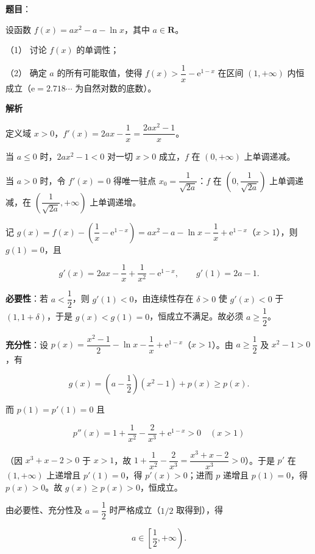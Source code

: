 \begin{answer}

\textbf{题目}：

设函数 \(f(x)=ax^{2}-a-\ln x\)，其中 \(a\in\mathbf{R}\)。

（1） 讨论 \(f(x)\) 的单调性；

（2） 确定 \(a\) 的所有可能取值，使得 \(f(x)>\dfrac{1}{x}-\mathrm{e}^{1-x}\) 在区间 \((1,+\infty)\) 内恒成立（\(\mathrm{e}=2.718\cdots\) 为自然对数的底数）。

\textbf{解析}

定义域 \(x>0\)，\(f'(x)=2ax-\dfrac{1}{x}=\dfrac{2ax^{2}-1}{x}\)。


当 \(a\leqslant0\) 时，\(2ax^{2}-1<0\) 对一切 \(x>0\) 成立，\(f\) 在 \((0,+\infty)\) 上单调递减。

当 \(a>0\) 时，令 \(f'(x)=0\) 得唯一驻点 \(x_0=\dfrac{1}{\sqrt{2a}}\)：\(f\) 在 \(\left(0,\dfrac{1}{\sqrt{2a}}\right)\) 上单调递减，在 \(\left(\dfrac{1}{\sqrt{2a}},+\infty\right)\) 上单调递增。



记 \(g(x)=f(x)-\left(\dfrac{1}{x}-\mathrm e^{1-x}\right)=ax^{2}-a-\ln x-\dfrac{1}{x}+\mathrm e^{1-x}\)（\(x>1\)），则 \(g(1)=0\)，且

\nopagebreak[4]
\[
g'(x)=2ax-\frac{1}{x}+\frac{1}{x^{2}}-\mathrm e^{1-x},\qquad g'(1)=2a-1.
\]

\textbf{必要性}：若 \(a<\dfrac{1}{2}\)，则 \(g'(1)<0\)，由连续性存在 \(\delta>0\) 使 \(g'(x)<0\) 于 \((1,1+\delta)\)，于是 \(g(x)<g(1)=0\)，恒成立不满足。故必须 \(a\geqslant\dfrac{1}{2}\)。

\textbf{充分性}：设 \(p(x)=\dfrac{x^{2}-1}{2}-\ln x-\dfrac{1}{x}+\mathrm e^{1-x}\)（\(x>1\)）。由 \(a\geqslant\dfrac{1}{2}\) 及 \(x^{2}-1>0\)，有

\nopagebreak[4]
\[
g(x)=\left(a-\frac{1}{2}\right)(x^{2}-1)+p(x)\geqslant p(x).
\]

而 \(p(1)=p'(1)=0\) 且

\nopagebreak[4]
\[
p''(x)=1+\frac{1}{x^{2}}-\frac{2}{x^{3}}+\mathrm e^{1-x}>0\quad(x>1)
\]

（因 \(x^{3}+x-2>0\) 于 \(x>1\)，故 \(1+\dfrac{1}{x^{2}}-\dfrac{2}{x^{3}}=\dfrac{x^{3}+x-2}{x^{3}}>0\)）。于是 \(p'\) 在 \((1,+\infty)\) 上递增且 \(p'(1)=0\)，得 \(p'(x)>0\)；进而 \(p\) 递增且 \(p(1)=0\)，得 \(p(x)>0\)。故 \(g(x)\geqslant p(x)>0\)，恒成立。

由必要性、充分性及 \(a=\dfrac{1}{2}\) 时严格成立（\(1/2\) 取得到），得

\nopagebreak[4]
\[
a\in\left[\dfrac{1}{2},+\infty\right).
\]


\gkanswer{答案（2）：\(a\in\left[\dfrac{1}{2},+\infty\right)\)（左端闭）。}

\end{answer}
